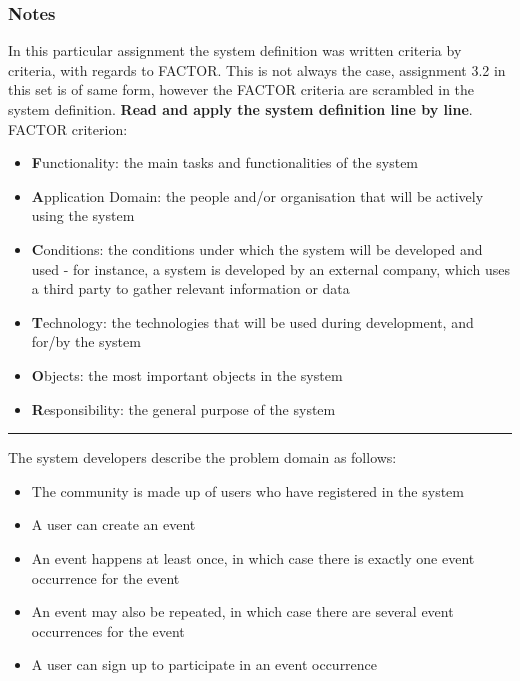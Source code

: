\subsubsection*{Notes}
In this particular assignment the system definition was written criteria by criteria, with regards to FACTOR. This is not always the case, assignment 3.2 in this set is of same form, however the FACTOR criteria are scrambled in the system definition. \textbf{Read and apply the system definition line by line}.\\
FACTOR criterion:
\begin{itemize}
    \item \textbf{F}unctionality: the main tasks and functionalities of the system
    \item \textbf{A}pplication Domain: the people and/or organisation that will be actively using the system
    \item \textbf{C}onditions: the conditions under which the system will be developed and used - for instance, a system is developed by an external company, which uses a third party to gather relevant information or data
    \item \textbf{T}echnology: the technologies that will be used during development, and for/by the system
    \item \textbf{O}bjects: the most important objects in the system
    \item \textbf{R}esponsibility: the general purpose of the system
\end{itemize}
\begin{center}
    \rule{10cm}{.4pt}
\end{center}
The system developers describe the problem domain as follows:
\begin{itemize}
    \item The community is made up of users who have registered in the system
    \item A user can create an event
    \item An event happens at least once, in which case there is exactly one event occurrence for the event
    \item An event may also be repeated, in which case there are several event occurrences for the event 
    \item A user can sign up to participate in an event occurrence
\end{itemize}

